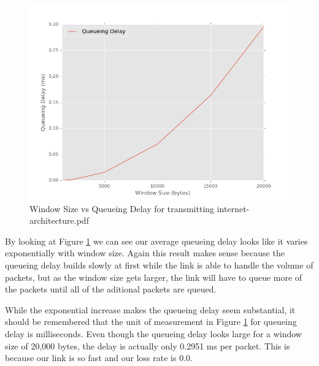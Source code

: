\documentclass[11pt]{article}
\begin{document}
\begin{figure}[H]
\caption{Window Size vs Queueing Delay for transmitting internet-architecture.pdf}
\label{queueing}
  \centering
  \includegraphics[width=15cm]{queueing}
\end{figure}

By looking at Figure \ref{queueing} we can see our average queueing delay looks like it varies exponentially with window size. Again this result makes sense because the queueing delay builds slowly at first while the link is able to handle the volume of packets, but as the window size gets larger, the link will have to queue more of the packets until all of the aditional packets are queued.

While the exponential increase makes the queueing delay seem substantial, it should be remembered that the unit of measurement in Figure \ref{queueing} for queueing delay is milliseconds. Even though the queueing delay looks large for a window size of 20,000 bytes, the delay is actually only 0.2951 ms per packet. This is because our link is so fast and our loss rate is 0.0.
\end{document}
